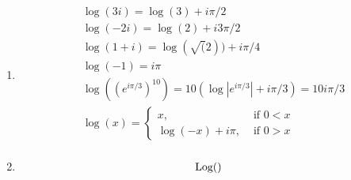\documentclass{article}
\begin{document}
\begin{enumerate}
\begin{enumerate}[label=(\roman*)]
      \end{enumerate}
    \item
      \begin{align*}
        &\log(3i)=\log(3)+i\pi/2\\
        &\log(-2i)=\log(2)+i3\pi/2\\
        &\log(1+i)=\log(\sqrt(2))+i\pi/4\\
        &\log(-1)=i\pi\\
        &\log((e^{i\pi/3})^{10})=10(\log|e^{i\pi/3}|+i\pi/3)=10i\pi/3\\
        &\log(x)=\begin{cases}
          x,&\text{ if }0<x\\
          \log(-x)+i\pi,&\text{ if }0>x
        \end{cases}\\
      \end{align*}
    \item
      \begin{align*}
        \text{Log}()
      \end{align*}
  \end{enumerate}
\end{document}
